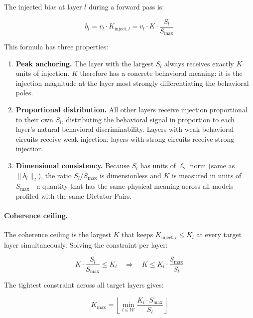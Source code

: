 \documentclass[10pt]{article}
\begin{document}
The injected bias at layer $l$ during a forward pass is:

\begin{equation}
  b_l = v_l \cdot K_{\text{inject},l} = v_l \cdot K \cdot \frac{S_l}{S_\text{max}}
  \label{eq:bias}
\end{equation}

This formula has three properties:

\begin{enumerate}[leftmargin=*]
  \item \textbf{Peak anchoring.} The layer with the largest $S_l$ always
    receives exactly $K$ units of injection.  $K$ therefore has a concrete
    behavioral meaning: it is the injection magnitude at the layer most
    strongly differentiating the behavioral poles.
  \item \textbf{Proportional distribution.} All other layers receive
    injection proportional to their own $S_l$, distributing the behavioral
    signal in proportion to each layer's natural behavioral discriminability.
    Layers with weak behavioral circuits receive weak injection; layers with
    strong circuits receive strong injection.
  \item \textbf{Dimensional consistency.} Because $S_l$ has units of
    $\ell_2$ norm (same as $\|b_l\|_2$), the ratio $S_l / S_\text{max}$ is
    dimensionless and $K$ is measured in units of $S_\text{max}$---a quantity
    that has the same physical meaning across all models profiled with the same
    Dictator Pairs.
\end{enumerate}

\paragraph{Coherence ceiling.}
The coherence ceiling is the largest $K$ that keeps $K_{\text{inject},l} \leq
K_l$ at every target layer simultaneously.  Solving the constraint per layer:

\begin{equation}
  K \cdot \frac{S_l}{S_\text{max}} \leq K_l
  \quad\Longrightarrow\quad
  K \leq K_l \cdot \frac{S_\text{max}}{S_l}
  \label{eq:constraint}
\end{equation}

The tightest constraint across all target layers gives:

\begin{equation}
  K_\text{max} = \left\lfloor \min_{l \in \mathcal{W}} \frac{K_l \cdot S_\text{max}}{S_l} \right\rfloor
  \label{eq:Kmax}
\end{equation}
\end{document}
